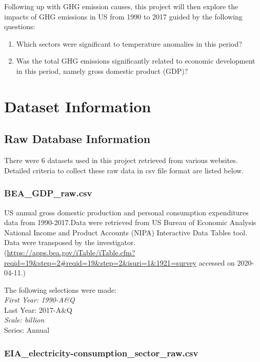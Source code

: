 \documentclass[12pt,]{article}
\providecommand{\tightlist}{%
  \setlength{\itemsep}{0pt}\setlength{\parskip}{0pt}}
\begin{document}
Following up with GHG emission causes, this project will then explore
the impacts of GHG emissions in US from 1990 to 2017 guided by the
following questions:

\begin{enumerate}
\def\labelenumi{\arabic{enumi}.}
\setcounter{enumi}{2}
\tightlist
\item
  Which sectors were significant to temperature anomalies in this
  period?
\item
  Was the total GHG emissions significantly related to economic
  development in this period, namely gross domestic product (GDP)?
\end{enumerate}

\newpage

\section{Dataset Information}\label{dataset-information}

\subsection{Raw Database Information}\label{raw-database-information}

There were 6 datasets used in this project retrieved from various
websites. Detailed criteria to collect these raw data in csv file format
are listed below.

\subsubsection{BEA\_GDP\_raw.csv}\label{bea_gdp_raw.csv}

US annual gross domestic production and personal consumption
expenditures data from 1990-2017.Data were retrieved from US Bureau of
Economic Analysis National Income and Product Accounts (NIPA)
Interactive Data Tables tool. Data were transposed by the
investigator.\\
(\url{https://apps.bea.gov/iTable/iTable.cfm?reqid=19\&step=2\#reqid=19\&step=2\&isuri=1\&1921=survey}
accessed on 2020-04-11.)

The following selections were made:\\
\emph{First Year: 1990-A\&Q\\
}Last Year: 2017-A\&Q\\
\emph{Scale: billion\\
}Series: Annual

\subsubsection{EIA\_electricity-consumption\_sector\_raw.csv}\label{eia_electricity-consumption_sector_raw.csv}
\end{document}
